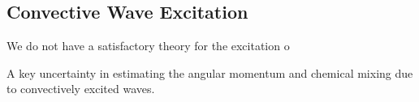 {\color{purple}
\subsection{Convective Wave Excitation}
}

We do not have a satisfactory theory for the excitation o

A key uncertainty in estimating the angular momentum and chemical mixing due to convectively excited waves.
